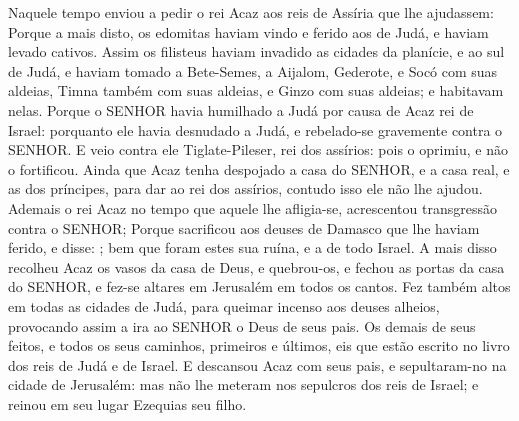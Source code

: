 {  Naquele tempo enviou a pedir o rei Acaz aos reis de Assíria que lhe ajudassem:
  Porque a mais disto, os edomitas haviam vindo e ferido aos de Judá, e haviam levado cativos.
  Assim os filisteus haviam invadido as cidades da planície, e ao sul de Judá, e haviam tomado a Bete-Semes, a Aijalom, Gederote, e Socó com suas aldeias, Timna também com suas aldeias, e Ginzo com suas aldeias; e habitavam nelas.
  Porque o SENHOR havia humilhado a Judá por causa de Acaz rei de Israel: porquanto ele havia desnudado a Judá, e rebelado-se gravemente contra o SENHOR.
  E veio contra ele Tiglate-Pileser, rei dos assírios: pois o oprimiu, e não o fortificou.
  Ainda que Acaz tenha despojado a casa do SENHOR, e a casa real, e as dos príncipes, para dar ao rei dos assírios, contudo isso ele não lhe ajudou.
  Ademais o rei Acaz no tempo que aquele lhe afligia-se, acrescentou transgressão contra o SENHOR;
  Porque sacrificou aos deuses de Damasco que lhe haviam ferido, e disse: ; bem que foram estes sua ruína, e a de todo Israel.
  A mais disso recolheu Acaz os vasos da casa de Deus, e quebrou-os, e fechou as portas da casa do SENHOR, e fez-se altares em Jerusalém em todos os cantos.
  Fez também altos em todas as cidades de Judá, para queimar incenso aos deuses alheios, provocando assim a ira ao SENHOR o Deus de seus pais.
  Os demais de seus feitos, e todos os seus caminhos, primeiros e últimos, eis que estão escrito no livro dos reis de Judá e de Israel. %
  E descansou Acaz com seus pais, e sepultaram-no na cidade de Jerusalém: mas não lhe meteram nos sepulcros dos reis de Israel; e reinou em seu lugar Ezequias seu filho.
\par }

